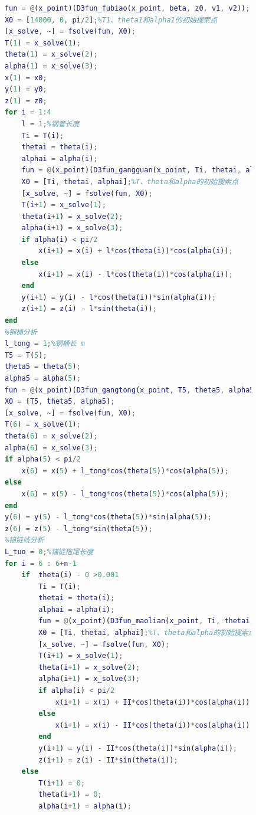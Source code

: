 \begin{lstlisting}[language = Matlab]
            %浮标、钢管分析
            fun = @(x_point)(D3fun_fubiao(x_point, beta, z0, v1, v2));
            X0 = [14000, 0, pi/2];%T1、theta1和alpha1的初始搜索点
            [x_solve, ~] = fsolve(fun, X0);
            T(1) = x_solve(1);
            theta(1) = x_solve(2);
            alpha(1) = x_solve(3);
            x(1) = x0;
            y(1) = y0;
            z(1) = z0;
            for i = 1:4
                l = 1;%钢管长度
                Ti = T(i);
                thetai = theta(i);
                alphai = alpha(i);
                fun = @(x_point)(D3fun_gangguan(x_point, Ti, thetai, alphai, beta, v2));
                X0 = [Ti, thetai, alphai];%T、theta和alpha的初始搜索点
                [x_solve, ~] = fsolve(fun, X0);
                T(i+1) = x_solve(1);
                theta(i+1) = x_solve(2);
                alpha(i+1) = x_solve(3);
                if alpha(i) < pi/2
                    x(i+1) = x(i) + l*cos(theta(i))*cos(alpha(i));
                else
                    x(i+1) = x(i) - l*cos(theta(i))*cos(alpha(i));
                end
                y(i+1) = y(i) - l*cos(theta(i))*sin(alpha(i));
                z(i+1) = z(i) - l*sin(theta(i));
            end
            %钢桶分析
            l_tong = 1;%钢桶长 m
            T5 = T(5);
            theta5 = theta(5);
            alpha5 = alpha(5);
            fun = @(x_point)(D3fun_gangtong(x_point, T5, theta5, alpha5, beta, v2, m_qiu));
            X0 = [T5, theta5, alpha5];
            [x_solve, ~] = fsolve(fun, X0);
            T(6) = x_solve(1);
            theta(6) = x_solve(2);
            alpha(6) = x_solve(3);
            if alpha(5) < pi/2
                x(6) = x(5) + l_tong*cos(theta(5))*cos(alpha(5));
            else
                x(6) = x(5) - l_tong*cos(theta(5))*cos(alpha(5));
            end
            y(6) = y(5) - l_tong*cos(theta(5))*sin(alpha(5));
            z(6) = z(5) - l_tong*sin(theta(5));
            %锚链线分析
            L_tuo = 0;%锚链拖尾长度
            for i = 6 : 6+n-1
                if  theta(i) - 0 >0.001
                    Ti = T(i);
                    thetai = theta(i);
                    alphai = alpha(i);
                    fun = @(x_point)(D3fun_maolian(x_point, Ti, thetai, alphai, I));
                    X0 = [Ti, thetai, alphai];%T、theta和alpha的初始搜索点
                    [x_solve, ~] = fsolve(fun, X0);
                    T(i+1) = x_solve(1);
                    theta(i+1) = x_solve(2);
                    alpha(i+1) = x_solve(3);
                    if alpha(i) < pi/2
                        x(i+1) = x(i) + II*cos(theta(i))*cos(alpha(i));
                    else
                        x(i+1) = x(i) - II*cos(theta(i))*cos(alpha(i));
                    end
                    y(i+1) = y(i) - II*cos(theta(i))*sin(alpha(i));
                    z(i+1) = z(i) - II*sin(theta(i));
                else
                    T(i+1) = 0;
                    theta(i+1) = 0;
                    alpha(i+1) = alpha(i);


\end{lstlisting}
